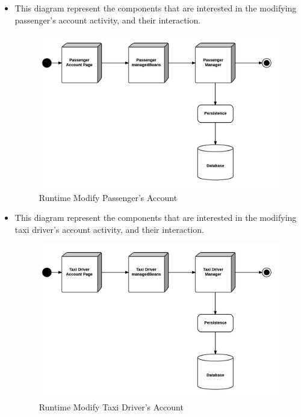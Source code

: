 \begin{itemize}
	\item This diagram represent the components that are interested in the modifying passenger's account activity, and their interaction.
	\begin{figure}[htbp]
	\centering
	\includegraphics[width=\textwidth]{cpt/img/RuntimeModifyPageView}
	\caption{Runtime Modify Passenger's Account}
	\end{figure}
	\clearpage
	
	\item This diagram represent the components that are interested in the modifying taxi driver's account activity, and their interaction.
	\begin{figure}[htbp]
	\centering
	\includegraphics[width=\textwidth]{cpt/img/RuntimeModifyPageTaxidriverView}
	\caption{Runtime Modify Taxi Driver's Account}
	\end{figure}
	\clearpage
	

\end{itemize}
